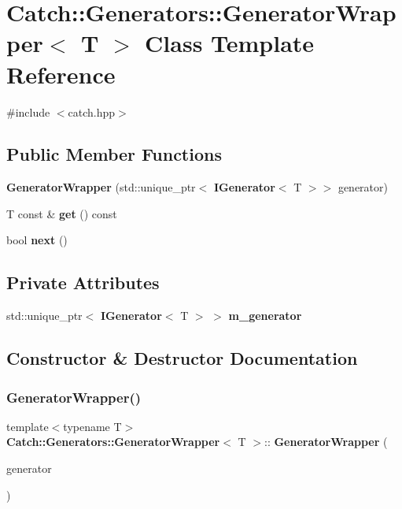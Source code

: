 \section{Catch\+::Generators\+::Generator\+Wrapper$<$ T $>$ Class Template Reference}
\label{class_catch_1_1_generators_1_1_generator_wrapper}


{\ttfamily \#include $<$catch.\+hpp$>$}

\subsection*{Public Member Functions}
\begin{DoxyCompactItemize}
\item 
\textbf{ Generator\+Wrapper} (std\+::unique\+\_\+ptr$<$ \textbf{ I\+Generator}$<$ T $>$$>$ generator)
\item 
T const  \& \textbf{ get} () const
\item 
bool \textbf{ next} ()
\end{DoxyCompactItemize}
\subsection*{Private Attributes}
\begin{DoxyCompactItemize}
\item 
std\+::unique\+\_\+ptr$<$ \textbf{ I\+Generator}$<$ T $>$ $>$ \textbf{ m\+\_\+generator}
\end{DoxyCompactItemize}


\subsection{Constructor \& Destructor Documentation}
\mbox{\label{class_catch_1_1_generators_1_1_generator_wrapper_aecffeafd4fd38d91a52dadf28b6e2b29}} 
\subsubsection{GeneratorWrapper()}
{\footnotesize\ttfamily template$<$typename T$>$ \\
\textbf{ Catch\+::\+Generators\+::\+Generator\+Wrapper}$<$ T $>$\+::\textbf{ Generator\+Wrapper} (\begin{DoxyParamCaption}\item[{std\+::unique\+\_\+ptr$<$ \textbf{ I\+Generator}$<$ T $>$$>$}]{generator }\end{DoxyParamCaption})\hspace{0.3cm}{\ttfamily [inline]}}




